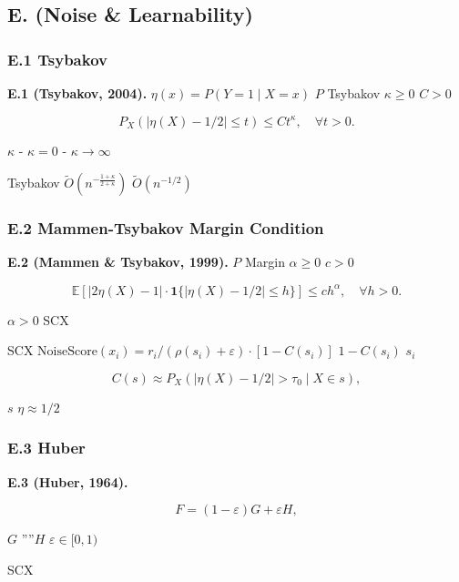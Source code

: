 \documentclass[
  12pt,
]{article}
\begin{document}
\subsection{E.  (Noise \&
Learnability)}\label{e.-ux566aux58f0ux4e0eux53efux5b66ux4e60ux6027-noise-learnability}

\subsubsection{E.1 Tsybakov
}\label{e.1-tsybakov-ux566aux58f0ux6761ux4ef6}

\textbf{ E.1 (Tsybakov, 2004).} 
\(\eta(x) = P(Y = 1 \mid X = x)\) \(P\)  Tsybakov
 \(\kappa \geq 0\) \(C > 0\) 

\[P_X(|\eta(X) - 1/2| \leq t) \leq C t^\kappa, \quad \forall t > 0.\]

\(\kappa\)  -
\(\kappa = 0\) -
\(\kappa \to \infty\)

Tsybakov \textbf{}
\(\tilde{O}(n^{-\frac{1+\kappa}{2+\kappa}})\)
\(\tilde{O}(n^{-1/2})\) 

\subsubsection{E.2 Mammen-Tsybakov Margin
Condition}\label{e.2-mammen-tsybakov-margin-condition}

\textbf{ E.2 (Mammen \& Tsybakov, 1999).}  \(P\)  Margin
 \(\alpha \geq 0\) \(c > 0\) 

\[\mathbb{E}[|2\eta(X) - 1| \cdot \mathbf{1}\{|\eta(X) - 1/2| \leq h\}] \leq c h^\alpha, \quad \forall h > 0.\]

 \(\alpha > 0\)  SCX 

SCX 
\(\text{NoiseScore}(x_i) = r_i/(\rho(s_i) + \varepsilon) \cdot [1 - C(s_i)]\)
 \(1 - C(s_i)\)  \(s_i\)
\textbf{}

\[C(s) \approx P_X(|\eta(X) - 1/2| > \tau_0 \mid X \in s),\]

 \(s\)  \(\eta \approx 1/2\)


\subsubsection{E.3  Huber
}\label{e.3-ux4e0e-huber-ux6c61ux67d3ux6a21ux578bux7684ux5173ux7cfb}

\textbf{ E.3 (Huber, 1964).} 

\[F = (1 - \varepsilon) G + \varepsilon H,\]

 \(G\) ''''\(H\) \(\varepsilon \in [0, 1)\)


SCX \textbf{}
\end{document}

